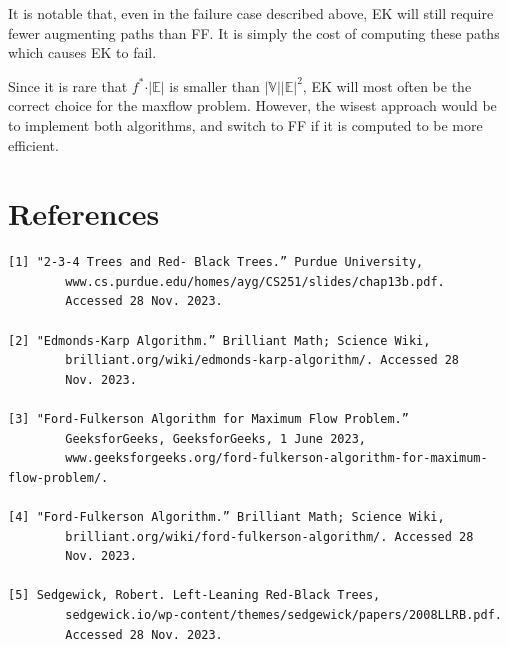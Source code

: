 \documentclass[12pt]{amsart}
\begin{document}
    It is notable that, even in the failure case described
    above, EK will still require fewer augmenting paths than FF.
    It is simply the cost of computing these paths which causes
    EK to fail.

    Since it is rare that $f^* \cdot \vert \mathbb{E} \vert$ is
    smaller than
    $\vert \mathbb{V} \vert \vert \mathbb{E} \vert ^2$, EK will
    most often be the correct choice for the maxflow problem.
    However, the wisest approach would be to implement both
    algorithms, and switch to FF if it is computed to be more
    efficient.

\newpage
\section{References}

\begin{verbatim}
[1] "2-3-4 Trees and Red- Black Trees.” Purdue University,
        www.cs.purdue.edu/homes/ayg/CS251/slides/chap13b.pdf.
        Accessed 28 Nov. 2023. 

[2] "Edmonds-Karp Algorithm.” Brilliant Math; Science Wiki,
        brilliant.org/wiki/edmonds-karp-algorithm/. Accessed 28
        Nov. 2023. 

[3] "Ford-Fulkerson Algorithm for Maximum Flow Problem.”
        GeeksforGeeks, GeeksforGeeks, 1 June 2023,
        www.geeksforgeeks.org/ford-fulkerson-algorithm-for-maximum-flow-problem/. 

[4] "Ford-Fulkerson Algorithm.” Brilliant Math; Science Wiki,
        brilliant.org/wiki/ford-fulkerson-algorithm/. Accessed 28
        Nov. 2023. 

[5] Sedgewick, Robert. Left-Leaning Red-Black Trees,
        sedgewick.io/wp-content/themes/sedgewick/papers/2008LLRB.pdf.
        Accessed 28 Nov. 2023. 
\end{verbatim}
\end{document}
